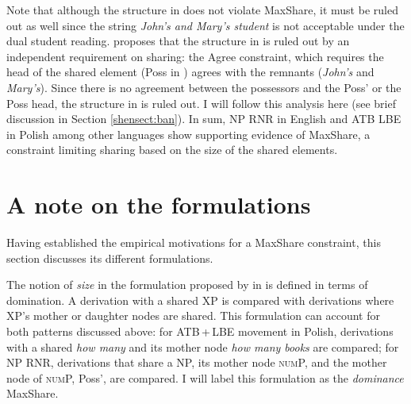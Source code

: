 \documentclass[output=paper]{langscibook}
\begin{document}
Note that although the structure in  does not violate MaxShare, it must be ruled out as well since the string \emph{John's and Mary's student} is not acceptable under the dual student reading. \citet{Shen:2018a} proposes that the structure in  is ruled out by an independent requirement on sharing: the Agree constraint, which requires the head of the shared element (Poss in ) agrees with the remnants (\textit{John's} and \textit{Mary's}). Since there is no agreement between the possessors and the Poss' or the Poss head, the structure in  is ruled out. I will follow this analysis here (see brief discussion in Section \ref{shensect:ban}).
%
%
In sum, NP RNR in English and ATB LBE in Polish among other languages show supporting evidence of MaxShare, a constraint limiting sharing based on the size of the shared elements. 

\section{A note on the formulations}
\label{shensect:formulations}

Having established the empirical motivations for a MaxShare constraint, this section discusses its different formulations. 

The notion of \textit{size} in the formulation proposed by \citet{Shen:2018a} in  is defined in terms of domination. A derivation with a shared XP is compared with derivations where XP's mother or daughter nodes are shared. This formulation can account for both patterns discussed above: for ATB\,+\,LBE movement in Polish, derivations with a shared \textit{how many} and its mother node \textit{how many books} are compared; for NP RNR, derivations that share a NP, its mother node \textsc{num}P, and the mother node of \textsc{num}P, Poss', are compared. I will label this formulation as the \textit{dominance} MaxShare.
\end{document}
